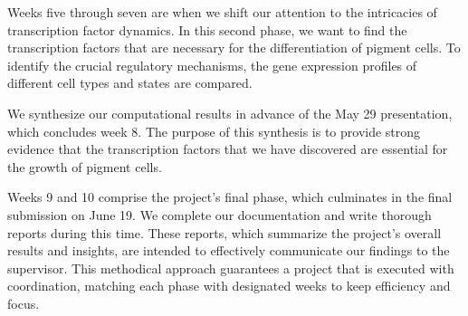 \documentclass[runningheads]{llncs}
\begin{document}
Weeks five through seven are when we shift our attention to the intricacies of transcription factor dynamics. In this second phase, we want to find the transcription factors that are necessary for the differentiation of pigment cells. To identify the crucial regulatory mechanisms, the gene expression profiles of different cell types and states are compared.

We synthesize our computational results in advance of the May 29 presentation, which concludes week 8. The purpose of this synthesis is to provide strong evidence that the transcription factors that we have discovered are essential for the growth of pigment cells.

Weeks 9 and 10 comprise the project's final phase, which culminates in the final submission on June 19. We complete our documentation and write thorough reports during this time. These reports, which summarize the project's overall results and insights, are intended to effectively communicate our findings to the supervisor. This methodical approach guarantees a project that is executed with coordination, matching each phase with designated weeks to keep efficiency and focus.

\paragraph{}
\paragraph{}




\end{document}
